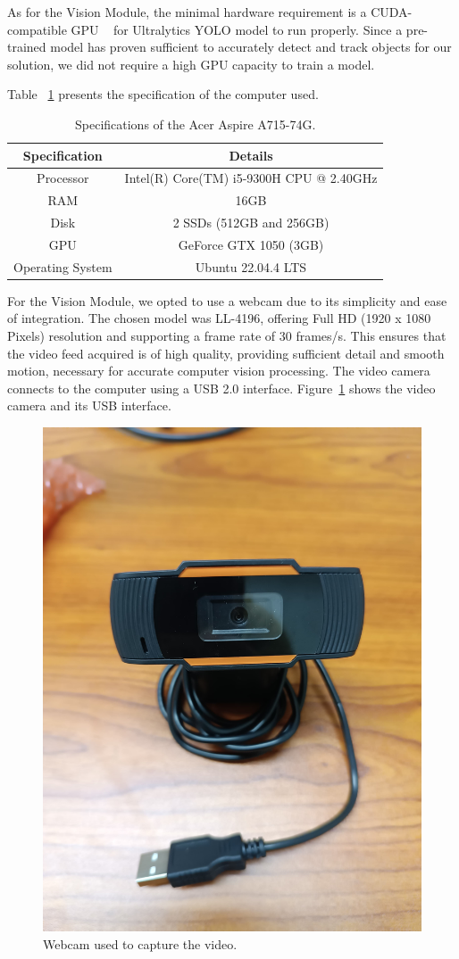 As for the Vision Module, the minimal hardware requirement is a CUDA-compatible GPU ~\cite{ultralytics_faq} for Ultralytics YOLO model to run properly.
Since a pre-trained model has proven sufficient to accurately detect and track objects for our solution, we did not require a high GPU capacity to train a model.

Table ~\ref{tab:specs_pc} presents the specification of the computer used.

\begin{table}[H]
    \caption{Specifications of the Acer Aspire A715-74G.}
    \label{tab:specs_pc}
    \begin{tabular}{|c|c|}
        \hline
        \textbf{Specification} & \textbf{Details} \\ \hline
        Processor                      &           Intel(R) Core(TM) i5-9300H CPU @ 2.40GHz   \\ \hline
        RAM                      &          16GB        \\ \hline
        Disk                      &   2 SSDs  (512GB and 256GB)         \\ \hline
        GPU                     &   GeForce GTX 1050 (3GB)      \\ \hline
        Operating System & Ubuntu 22.04.4 LTS                  \\ \hline
    \end{tabular}
\end{table}

For the Vision Module, we opted to use a webcam due to its simplicity and ease of integration.
The chosen model was LL-4196, offering Full HD (1920 x 1080 Pixels) resolution and supporting a frame rate of 30 frames/s\@.
This ensures that the video feed acquired is of high quality, providing sufficient detail and smooth motion, necessary for accurate computer vision processing.
The video camera connects to the computer using a USB 2.0 interface.
Figure~\ref{fig:camera} shows the video camera and its USB interface.

\begin{figure}[H]
    \centering
    \includegraphics[width=0.3\linewidth]{figures/webcam}
    \caption{Webcam used to capture the video.}
    \label{fig:camera}
\end{figure}

